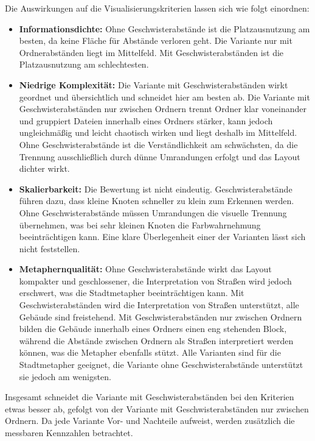Die Auswirkungen auf die Visualisierungskriterien lassen sich wie folgt einordnen:
\begin{itemize}
    \item \textbf{Informationsdichte:} Ohne Geschwisterabstände ist die Platzausnutzung am besten, da keine Fläche für Abstände verloren geht. Die Variante nur mit Ordnerabständen liegt im Mittelfeld. Mit Geschwisterabständen ist die Platzausnutzung am schlechtesten.
    \item \textbf{Niedrige Komplexität:} Die Variante mit Geschwisterabständen wirkt geordnet und übersichtlich und schneidet hier am besten ab. Die Variante mit Geschwisterabständen nur zwischen Ordnern trennt Ordner klar voneinander und gruppiert Dateien innerhalb eines Ordners stärker, kann jedoch ungleichmäßig und leicht chaotisch wirken und liegt deshalb im Mittelfeld. Ohne Geschwisterabstände ist die Verständlichkeit am schwächsten, da die Trennung ausschließlich durch dünne Umrandungen erfolgt und das Layout dichter wirkt.
    \item \textbf{Skalierbarkeit:} Die Bewertung ist nicht eindeutig. Geschwisterabstände führen dazu, dass kleine Knoten schneller zu klein zum Erkennen werden. Ohne Geschwisterabstände müssen Umrandungen die visuelle Trennung übernehmen, was bei sehr kleinen Knoten die Farbwahrnehmung beeinträchtigen kann. Eine klare Überlegenheit einer der Varianten lässt sich nicht feststellen.
    \item \textbf{Metaphernqualität:} Ohne Geschwisterabstände wirkt das Layout kompakter und geschlossener, die Interpretation von Straßen wird jedoch erschwert, was die Stadtmetapher beeinträchtigen kann. Mit Geschwisterabständen wird die Interpretation von Straßen unterstützt, alle Gebäude sind freistehend. Mit Geschwisterabständen nur zwischen Ordnern bilden die Gebäude innerhalb eines Ordners einen eng stehenden Block, während die Abstände zwischen Ordnern als Straßen interpretiert werden können, was die Metapher ebenfalls stützt. Alle Varianten sind für die Stadtmetapher geeignet, die Variante ohne Geschwisterabstände unterstützt sie jedoch am wenigsten.
\end{itemize}

Insgesamt schneidet die Variante mit Geschwisterabständen bei den Kriterien etwas besser ab, gefolgt von der Variante mit Geschwisterabständen nur zwischen Ordnern. Da jede Variante Vor- und Nachteile aufweist, werden zusätzlich die messbaren Kennzahlen betrachtet.

